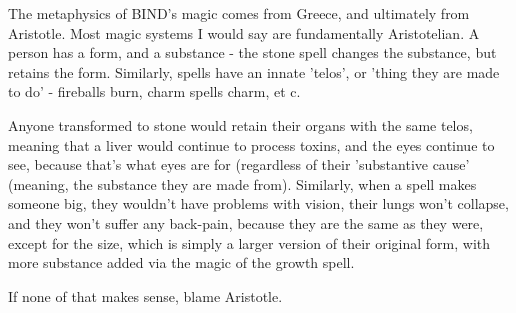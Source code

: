 The metaphysics of BIND's magic comes from Greece, and ultimately from Aristotle.
Most magic systems I would say are fundamentally Aristotelian.
A person has a form, and a substance - the stone spell changes the substance, but retains the form.
Similarly, spells have an innate 'telos', or 'thing they are made to do' - fireballs burn, charm spells charm, et c.

Anyone transformed to stone would retain their organs with the same telos, meaning that a liver would continue to process toxins, and the eyes continue to see, because that's what eyes are for (regardless of their 'substantive cause' (meaning, the substance they are made from).
Similarly, when a spell makes someone big, they wouldn't have problems with vision, their lungs won't collapse, and they won't suffer any back-pain, because they are the same as they were, except for the size, which is simply a larger version of their original form, with more substance added via the magic of the growth spell.

If none of that makes sense, blame Aristotle.
